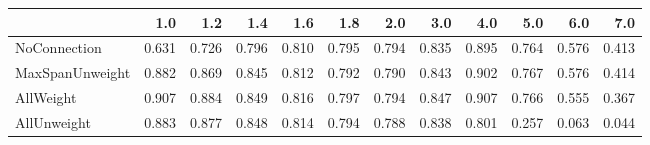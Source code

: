 \begin{tabular}{lrrrrrrrrrrr}
\toprule
{} &   1.0 &   1.2 &   1.4 &   1.6 &   1.8 &   2.0 &   3.0 &   4.0 &   5.0 &   6.0 &   7.0 \\
\midrule
NoConnection    & 0.631 & 0.726 & 0.796 & 0.810 & 0.795 & 0.794 & 0.835 & 0.895 & 0.764 & 0.576 & 0.413 \\
MaxSpanUnweight & 0.882 & 0.869 & 0.845 & 0.812 & 0.792 & 0.790 & 0.843 & 0.902 & 0.767 & 0.576 & 0.414 \\
AllWeight       & 0.907 & 0.884 & 0.849 & 0.816 & 0.797 & 0.794 & 0.847 & 0.907 & 0.766 & 0.555 & 0.367 \\
AllUnweight     & 0.883 & 0.877 & 0.848 & 0.814 & 0.794 & 0.788 & 0.838 & 0.801 & 0.257 & 0.063 & 0.044 \\
\bottomrule
\end{tabular}
